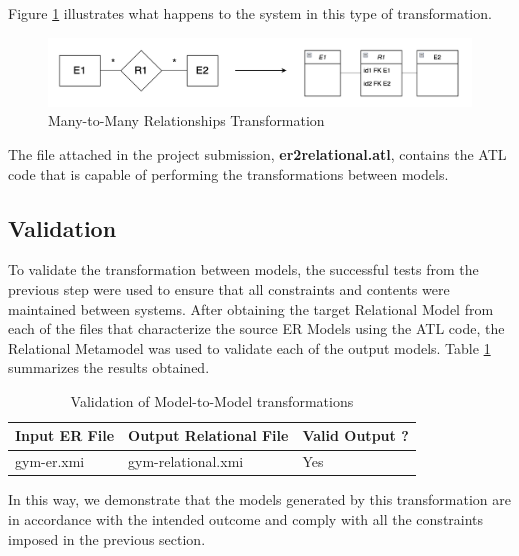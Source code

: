 \documentclass[10pt]{article}
\begin{document}
Figure \ref{figure8} illustrates what happens to the system in this type of transformation.

\begin{center}
    \begin{figure}[H]
        \centering
        \includegraphics[width=1.0\textwidth]{imgs/many-to-many-transformation.png}
            \caption{Many-to-Many Relationships Transformation}
        \label{figure8}
    \end{figure}
\end{center}

The file attached in the project submission, \textbf{er2relational.atl}, contains the ATL code that is capable of performing the transformations between models.

\subsection{Validation}

To validate the transformation between models, the successful tests from the previous step were used to ensure that all constraints and contents were maintained between systems. After obtaining the target Relational Model from each of the files that characterize the source ER Models using the ATL code, the Relational Metamodel was used to validate each of the output models. Table \ref{transformations-validation} summarizes the results obtained.

\begin{table}[H]
\centering
\begin{tabularx}{\textwidth}{|>{\centering\arraybackslash}X|>{\centering\arraybackslash}X|>{\centering\arraybackslash}p{3.5cm}|}
\hline
\textbf{Input ER File} & \textbf{Output Relational File} & \textbf{Valid Output ?} \\ \hline
gym-er.xmi & gym-relational.xmi & Yes \\ \hline
\end{tabularx}
\caption{Validation of Model-to-Model transformations}
\label{transformations-validation}
\end{table}

In this way, we demonstrate that the models generated by this transformation are in accordance with the intended outcome and comply with all the constraints imposed in the previous section.
\end{document}
